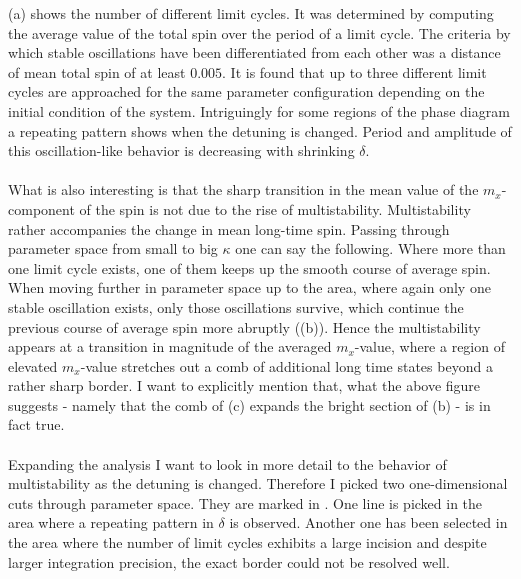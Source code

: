 (a) shows the number of different limit cycles. It was determined by computing the average value of the total spin over the period of a limit cycle. The criteria by which stable oscillations have been differentiated from each other was a distance of mean total spin of at least $0.005$. It is found that up to three different limit cycles are approached for the same parameter configuration depending on the initial condition of the system. Intriguingly for some regions of the phase diagram a repeating pattern shows when the detuning is changed. Period and amplitude of this oscillation-like behavior is decreasing with shrinking $\delta$. \\\\What is also interesting is that the sharp transition in the mean value of the $m_x$-component of the spin is not due to the rise of multistability. Multistability rather accompanies the change in mean long-time spin. Passing through parameter space from small to big $\kappa$ one can say the following. Where more than one limit cycle exists, one of them keeps up the smooth course of average spin. When moving further in parameter space up to the area, where again only one stable oscillation exists, only those oscillations survive, which continue the previous course of average spin more abruptly ((b)). Hence the multistability appears at a transition in magnitude of the averaged $m_x$-value, where a region of elevated $m_x$-value stretches out a comb of additional long time states beyond a rather sharp border. I want to explicitly mention that, what the above figure suggests - namely that the comb of (c) expands the bright section of (b) - is in  fact true.\\\\
Expanding the analysis I want to look in more detail to the behavior of multistability as the detuning is changed. Therefore I picked two one-dimensional cuts through parameter space. They are marked in . One line is picked in the area where a repeating pattern in $\delta$ is observed. Another one has been selected in the area where the number of limit cycles exhibits a large incision and despite larger integration precision, the exact border could not be resolved well. \\\\

